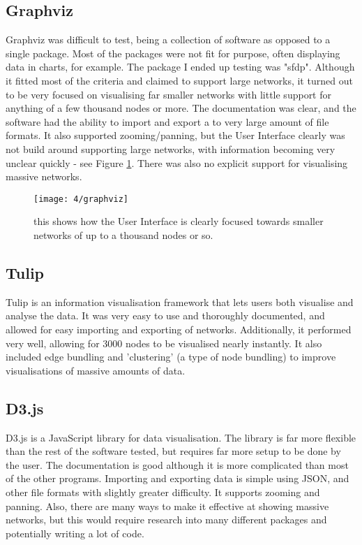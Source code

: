 \documentclass[../dissertation.tex]{subfiles}
\begin{document}
\subsection{Graphviz}

Graphviz was difficult to test, being a collection of software as opposed to a single package. Most of the packages were not fit for purpose, often displaying data in charts, for example. The package I ended up testing was "sfdp". Although it fitted most of the criteria and claimed to support large networks, it turned out to be very focused on visualising far smaller networks with little support for anything of a few thousand nodes or more. The documentation was clear, and the software had the ability to import and export a to very large amount of file formats. It also supported zooming/panning, but the User Interface clearly was not build around supporting large networks, with information becoming very unclear quickly - see Figure \ref{fig:graphviz}. There was also no explicit support for visualising massive networks.

\begin{figure}
    \centering
    \texttt{[image: 4/graphviz]}
    \caption{this shows how the User Interface is clearly focused towards smaller networks of up to a thousand nodes or so.}
    \label{fig:graphviz}
\end{figure}

\subsection{Tulip}

Tulip is an information visualisation framework that lets users both visualise and analyse the data. It was very easy to use and thoroughly documented, and allowed for easy importing and exporting of networks. Additionally, it performed very well, allowing for 3000 nodes to be visualised nearly instantly. It also included edge bundling and 'clustering' (a type of node bundling) to improve visualisations of massive amounts of data.

\subsection{D3.js}

D3.js is a JavaScript library for data visualisation. The library is far more flexible than the rest of the software tested, but requires far more setup to be done by the user. The documentation is good although it is more complicated than most of the other programs. Importing and exporting data is simple using JSON, and other file formats with slightly greater difficulty. It supports zooming and panning. Also, there are many ways to make it effective at showing massive networks, but this would require research into many different packages and potentially writing a lot of code.
\end{document}
